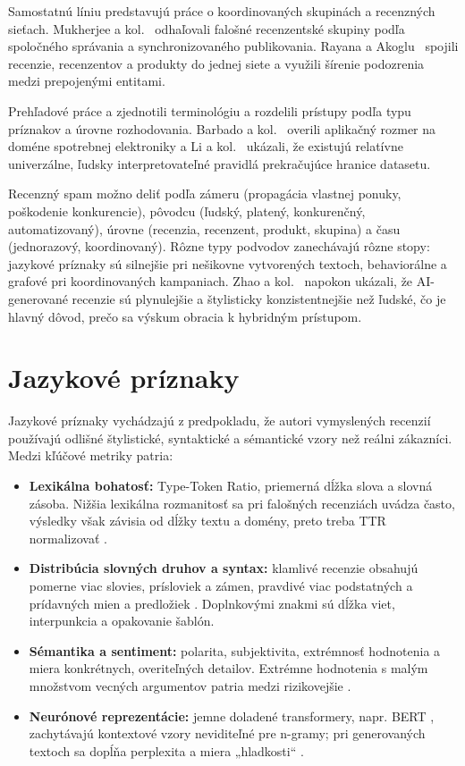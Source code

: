 \documentclass[10pt,twocolumn,twoside,slovak,a4paper]{article}
\begin{document}
Samostatnú líniu predstavujú práce o koordinovaných skupinách a recenzných sieťach. Mukherjee a kol.~\cite{mukherjee2012} odhaľovali falošné recenzentské skupiny podľa spoločného správania a synchronizovaného publikovania. Rayana a Akoglu~\cite{rayana2015} spojili recenzie, recenzentov a produkty do jednej siete a využili šírenie podozrenia medzi prepojenými entitami.

Prehľadové práce \cite{crawford2015} a \cite{heydari2015} zjednotili terminológiu a rozdelili prístupy podľa typu príznakov a úrovne rozhodovania. Barbado a kol.~\cite{barbado2019} overili aplikačný rozmer na doméne spotrebnej elektroniky a Li a kol.~\cite{li2014} ukázali, že existujú relatívne univerzálne, ľudsky interpretovateľné pravidlá prekračujúce hranice datasetu.

Recenzný spam možno deliť podľa zámeru (propagácia vlastnej ponuky, poškodenie konkurencie), pôvodcu (ľudský, platený, konkurenčný, automatizovaný), úrovne (recenzia, recenzent, produkt, skupina) a času (jednorazový, koordinovaný). Rôzne typy podvodov zanechávajú rôzne stopy: jazykové príznaky sú silnejšie pri nešikovne vytvorených textoch, behaviorálne a grafové pri koordinovaných kampaniach. Zhao a kol.~\cite{zhao2025} napokon ukázali, že AI-generované recenzie sú plynulejšie a štylisticky konzistentnejšie než ľudské, čo je hlavný dôvod, prečo sa výskum obracia k hybridným prístupom.


\section{Jazykové príznaky} \label{jazykove}

Jazykové príznaky vychádzajú z predpokladu, že autori vymyslených recenzií používajú odlišné štylistické, syntaktické a sémantické vzory než reálni zákazníci. Medzi kľúčové metriky patria:

\begin{itemize}
  \item \textbf{Lexikálna bohatosť:} Type-Token Ratio, priemerná dĺžka slova a slovná zásoba. Nižšia lexikálna rozmanitosť sa pri falošných recenziách uvádza často, výsledky však závisia od dĺžky textu a domény, preto treba TTR normalizovať \cite{ott2011,heydari2015}.
  \item \textbf{Distribúcia slovných druhov a syntax:} klamlivé recenzie obsahujú pomerne viac slovies, prísloviek a zámen, pravdivé viac podstatných a prídavných mien a predložiek \cite{ott2011}. Doplnkovými znakmi sú dĺžka viet, interpunkcia a opakovanie šablón.
  \item \textbf{Sémantika a sentiment:} polarita, subjektivita, extrémnosť hodnotenia a miera konkrétnych, overiteľných detailov. Extrémne hodnotenia s malým množstvom vecných argumentov patria medzi rizikovejšie \cite{li2014}.
  \item \textbf{Neurónové reprezentácie:} jemne doladené transformery, napr. BERT \cite{devlin2019}, zachytávajú kontextové vzory neviditeľné pre n-gramy; pri generovaných textoch sa dopĺňa perplexita a miera „hladkosti“ \cite{zhao2025}.
\end{itemize}
\end{document}
